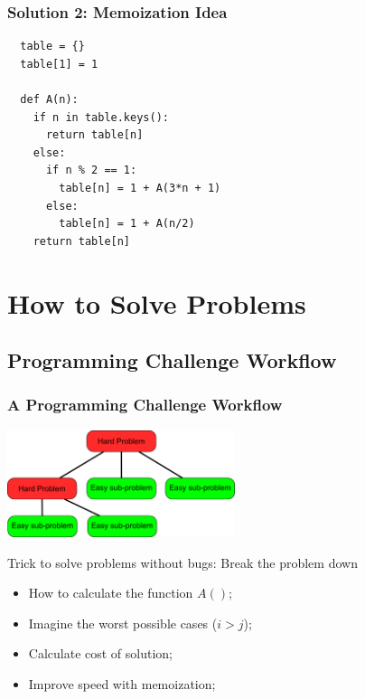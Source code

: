 \documentclass{beamer}
\begin{document}
\begin{frame}[fragile]
  \frametitle{Solution 2: Memoization Idea}
\begin{verbatim}
  table = {}
  table[1] = 1

  def A(n):
    if n in table.keys():
      return table[n]
    else:
      if n % 2 == 1:
        table[n] = 1 + A(3*n + 1)
      else:
        table[n] = 1 + A(n/2)
    return table[n]
\end{verbatim}
\end{frame}

\section{How to Solve Problems}
\subsection{Programming Challenge Workflow}
\begin{frame}
  \frametitle{A Programming Challenge Workflow}

  \begin{center}
    \includegraphics[width=0.5\textwidth]{../img/breakingtheproblem}
  \end{center}

  Trick to solve problems without bugs: Break the problem down
  \bigskip

  \begin{itemize}
  \item How to calculate the function $A()$;
  \item Imagine the worst possible cases ($i > j$);
  \item Calculate cost of solution;
  \item Improve speed with memoization;
  \end{itemize}
\end{frame}
\end{document}
